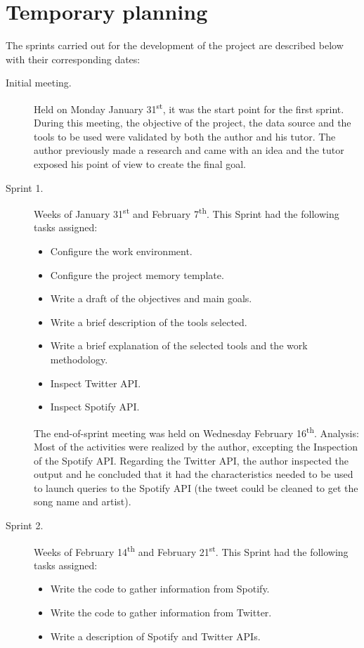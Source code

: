 \section{Temporary planning}
\nonzeroparskip The sprints carried out for the development of the project are described below with their corresponding dates:
\begin{description}
	\item[Initial meeting.] Held on Monday January 31\textsuperscript{st}, it was the start point for the first sprint. During this meeting, the objective of the project, the data source and the tools to be used were validated by both the author and his tutor. The author previously made a research and came with an idea and the tutor exposed his point of view to create the final goal.
	\item[Sprint 1.] Weeks of January 31\textsuperscript{st} and February 7\textsuperscript{th}. This Sprint had the following tasks assigned:
	\begin{itemize}
		\item Configure the work environment.
		\item Configure the project memory template.
		\item Write a draft of the objectives and main goals.
		\item Write a brief description of the tools selected.
		\item Write a brief explanation of the selected tools and the work methodology.
		\item Inspect Twitter API.
		\item Inspect Spotify API.
	\end{itemize}
	The end-of-sprint meeting was held on Wednesday February 16\textsuperscript{th}.
	Analysis: Most of the activities were realized by the author, excepting the Inspection of the Spotify API. Regarding the Twitter API, the author inspected the output and he concluded that it had the characteristics needed to be used to launch queries to the Spotify API (the tweet could be cleaned to get the song name and artist).
	\item[Sprint 2.] Weeks of February 14\textsuperscript{th} and February 21\textsuperscript{st}. This Sprint had the following tasks assigned:
	\begin{itemize}
		\item Write the code to gather information from Spotify.
		\item Write the code to gather information from Twitter.
		\item Write a description of Spotify and Twitter APIs.

\end{itemize}
\end{description}
